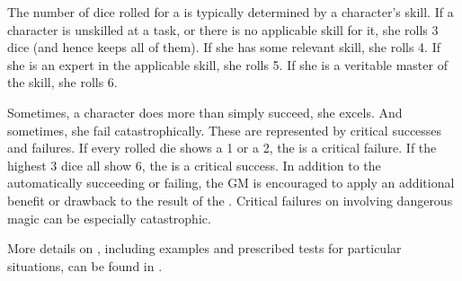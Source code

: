 The number of dice rolled for a {\test} is typically determined by a character's skill.
If a character is unskilled at a task, or there is no applicable skill for it, she rolls 3 dice (and hence keeps all of them).
If she has some relevant skill, she rolls 4.
If she is an expert in the applicable skill, she rolls 5.
If she is a veritable master of the skill, she rolls 6.

Sometimes, a character does more than simply succeed, she excels.
And sometimes, she fail catastrophically.
These are represented by critical successes and failures.
If every rolled die shows a 1 or a 2, the {\test} is a critical failure.
If the highest 3 dice all show 6, the {\test} is a critical success.
In addition to the {\test} automatically succeeding or failing, the GM is encouraged to apply an additional benefit or drawback to the result of the {\test}.
Critical failures on {\tests} involving dangerous magic can be especially catastrophic.

More details on {\tests}, including examples and prescribed tests for particular situations, can be found in . %
